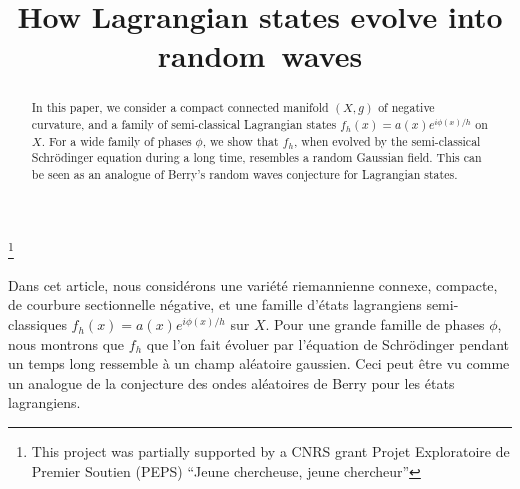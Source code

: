 \documentclass[JEP,XML,SOM,Unicode,published]{cedram}
\theoremstyle{plain}
\theoremstyle{definition}
\begin{document}
\frontmatter

\title{How Lagrangian states evolve into random~waves}

\author[\initial{M.} \lastname{Ingremeau}]{ }
\address{Laboratoire J.A. Dieudonné, Université Côte d'Azur\\
Parc Valrose, 06108 Nice Cedex 2, France}

\author[\initial{A.} \lastname{Rivera}]{ }
\address{École Polytechnique Fédérale de Lausanne, Chair of Random Geometry\\
CH-1015 Lausanne, Suisse}
\email{}
\urladdr{}

\thanks{This project was partially supported by a CNRS grant Projet Exploratoire de Premier Soutien (PEPS) ``Jeune chercheuse, jeune chercheur''}

\begin{abstract}
In this paper, we consider a compact connected manifold $(X,g)$ of negative curvature, and a family of semi-classical Lagrangian states $f_h(x) = a(x) e^{i\phi(x)/h}$ on $X$. For a wide family of phases $\phi$, we show that $f_h$, when evolved by the semi-classical Schrödinger equation during a long time, resembles a random Gaussian field. This can be seen as an analogue of Berry's random waves conjecture for Lagrangian states.
\end{abstract}





\begin{altabstract}
Dans cet article, nous considérons une variété riemannienne connexe, compacte, de courbure sectionnelle négative, et une famille d’états lagrangiens semi-classiques $f_h(x) = a(x) e^{i\phi(x)/h}$ sur $X$. Pour une grande famille de phases $\phi$, nous montrons que $f_h$ que l’on fait évoluer par l’équation de Schrödinger pendant un temps long ressemble à un champ aléatoire gaussien. Ceci peut être vu comme un analogue de la conjecture des ondes aléatoires de Berry pour les états lagrangiens.
\end{altabstract}
\end{document}
